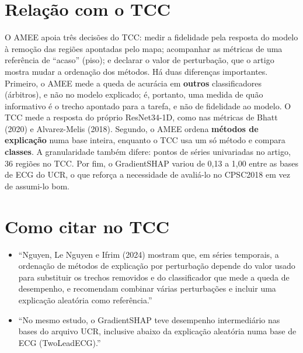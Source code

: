 \documentclass[11pt,a4paper]{article}
\begin{document}
\section{Relação com o TCC}
O AMEE apoia três decisões do TCC: medir a fidelidade pela resposta do modelo à remoção das regiões apontadas pelo mapa; acompanhar as métricas de uma referência de ``acaso'' (piso); e declarar o valor de perturbação, que o artigo mostra mudar a ordenação dos métodos. Há duas diferenças importantes. Primeiro, o AMEE mede a queda de acurácia em \textbf{outros} classificadores (árbitros), e não no modelo explicado; é, portanto, uma medida de quão informativo é o trecho apontado para a tarefa, e não de fidelidade ao modelo. O TCC mede a resposta do próprio ResNet34-1D, como nas métricas de Bhatt (2020) e Alvarez-Melis (2018). Segundo, o AMEE ordena \textbf{métodos de explicação} numa base inteira, enquanto o TCC usa um só método e compara \textbf{classes}. A granularidade também difere: pontos de séries univariadas no artigo, 36 regiões no TCC. Por fim, o GradientSHAP variou de 0,13 a 1,00 entre as bases de ECG do UCR, o que reforça a necessidade de avaliá-lo no CPSC2018 em vez de assumi-lo bom.

\section{Como citar no TCC}
\begin{itemize}
\item ``Nguyen, Le Nguyen e Ifrim (2024) mostram que, em séries temporais, a ordenação de métodos de explicação por perturbação depende do valor usado para substituir os trechos removidos e do classificador que mede a queda de desempenho, e recomendam combinar várias perturbações e incluir uma explicação aleatória como referência.''
\item ``No mesmo estudo, o GradientSHAP teve desempenho intermediário nas bases do arquivo UCR, inclusive abaixo da explicação aleatória numa base de ECG (TwoLeadECG).''
\end{itemize}
\end{document}
